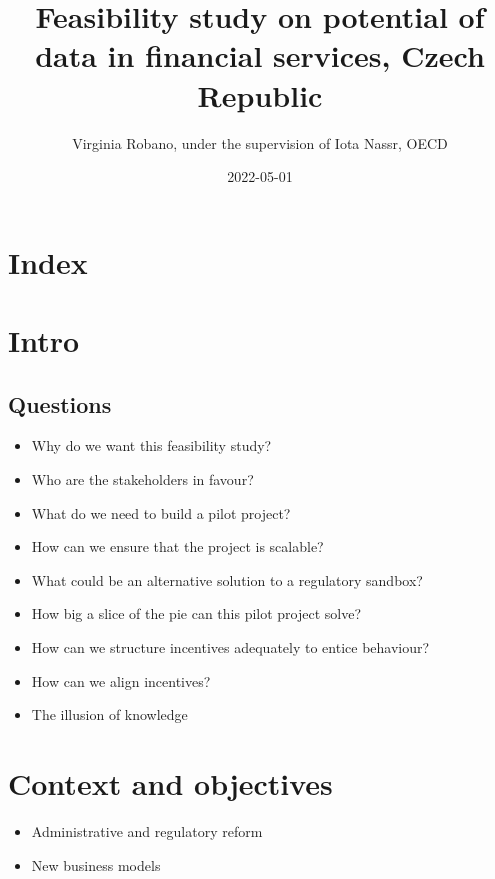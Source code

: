 \documentclass[
]{book}
\title{Feasibility study on potential of data in financial services, Czech Republic}
\author{Virginia Robano, under the supervision of Iota Nassr, OECD}
\date{2022-05-01}
\begin{document}
\maketitle

{
\setcounter{tocdepth}{1}
\tableofcontents
}
\hypertarget{index}{%
\chapter*{Index}\label{index}}

\hypertarget{intro}{%
\chapter{Intro}\label{intro}}

\hypertarget{questions}{%
\section{Questions}\label{questions}}

\begin{itemize}
\item
  Why do we want this feasibility study?
\item
  Who are the stakeholders in favour?
\item
  What do we need to build a pilot project?
\item
  How can we ensure that the project is scalable?
\item
  What could be an alternative solution to a regulatory sandbox?
\item
  How big a slice of the pie can this pilot project solve?
\item
  How can we structure incentives adequately to entice behaviour?
\item
  How can we align incentives?
\item
  The illusion of knowledge
\end{itemize}

\hypertarget{context-and-objectives}{%
\chapter{Context and objectives}\label{context-and-objectives}}

\begin{itemize}
\item
  Administrative and regulatory reform
\item
  New business models
\end{itemize}
\end{document}
